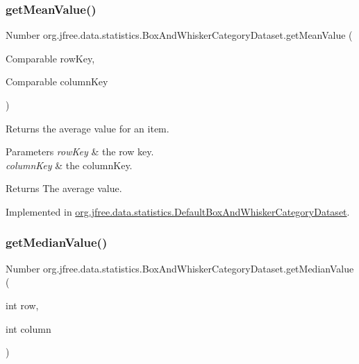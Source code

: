 \subsubsection{\texorpdfstring{get\+Mean\+Value()}{getMeanValue()}\hspace{0.1cm}{\footnotesize\ttfamily [2/2]}}
{\footnotesize\ttfamily Number org.\+jfree.\+data.\+statistics.\+Box\+And\+Whisker\+Category\+Dataset.\+get\+Mean\+Value (\begin{DoxyParamCaption}\item[{Comparable}]{row\+Key,  }\item[{Comparable}]{column\+Key }\end{DoxyParamCaption})}

Returns the average value for an item.


\begin{DoxyParams}{Parameters}
{\em row\+Key} & the row key. \\
\hline
{\em column\+Key} & the column\+Key.\\
\hline
\end{DoxyParams}
\begin{DoxyReturn}{Returns}
The average value. 
\end{DoxyReturn}


Implemented in \mbox{\hyperlink{classorg_1_1jfree_1_1data_1_1statistics_1_1_default_box_and_whisker_category_dataset_ae7121e3be6e26ded88ea1fdf5e4a55d0}{org.\+jfree.\+data.\+statistics.\+Default\+Box\+And\+Whisker\+Category\+Dataset}}.

\mbox{\label{interfaceorg_1_1jfree_1_1data_1_1statistics_1_1_box_and_whisker_category_dataset_a0744eb012274b3be674933d67474ed65}} 
\subsubsection{\texorpdfstring{get\+Median\+Value()}{getMedianValue()}\hspace{0.1cm}{\footnotesize\ttfamily [1/2]}}
{\footnotesize\ttfamily Number org.\+jfree.\+data.\+statistics.\+Box\+And\+Whisker\+Category\+Dataset.\+get\+Median\+Value (\begin{DoxyParamCaption}\item[{int}]{row,  }\item[{int}]{column }\end{DoxyParamCaption})}

